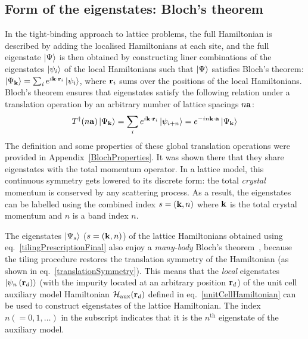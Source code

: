 \documentclass[reprint,hidelinks,onecolumn]{revtex4-2}
\begin{document}
\subsection{Form of the eigenstates: Bloch's theorem}
In the tight-binding approach to lattice problems, the full Hamiltonian is described by adding the localised Hamiltonians at each site, and the full eigenstate \(\ket{\Psi}\) is then obtained by constructing liner combinations of the eigenstates \(\ket{\psi_i}\) of the local Hamiltonians such that \(\ket{\Psi}\) satisfies Bloch's theorem: \(\ket{\Psi_{\bf k}} = \sum_{i} e^{i {\bf k}\cdot{\bf r}_i} \ket{\psi_i}\), where \({\bf r}_i\) sums over the positions of the local Hamiltonians. Bloch's theorem ensures that eigenstates satisfy the following relation under a translation operation by an arbitrary number of lattice spacings \({n\bf a}\):
\begin{equation}\begin{aligned}
	T^\dagger(n{\bf a})\ket{\Psi_{{\bf k}}} = \sum_{i} e^{i {\bf k}\cdot{\bf r}_i} \ket{\psi_{i + n}} = e^{-in{\bf k}\cdot{\bf a}}\ket{\Psi_{\bf k}}
\end{aligned}\end{equation}
The definition and some properties of these global translation operations were provided in Appendix~\ref{BlochProperties}. It was shown there that they share eigenstates with the total momentum operator. In a lattice model, this continuous symmetry gets lowered to its discrete form: the total {\it crystal} momentum is conserved by any scattering process. As a result, the eigenstates can be labelled using the combined index \(s = \left({\bf k}, n\right) \) where \({\bf k}\) is the total crystal momentum and \(n\) is a band index \(n\).

The eigenstates \(\ket{\Psi_{s}}\) (\(s = \left({\bf k}, n\right)\)) of the lattice Hamiltonians obtained using eq.~\ref{tilingPrescriptionFinal} also enjoy a {\it many-body} Bloch's theorem~\cite{stoyanova}, because the tiling procedure restores the translation symmetry of the Hamiltonian (as shown in eq.~\ref{translationSymmetry}). This means that the {\it local} eigenstates \(\ket{\psi_n\left({\bf r}_d\right)}\) (with the impurity located at an arbitrary position \({\bf r}_d\)) of the unit cell auxiliary model Hamiltonian \(\mathcal{H}_\text{aux}({\bf r}_d)\) defined in eq.~\ref{unitCellHamiltonian} can be used to construct eigenstates of the lattice Hamiltonian. The index \(n(=0,1,\ldots)\) in the subscript indicates that it is the \(n^\text{th}\) eigenstate of the auxiliary model.
\end{document}
